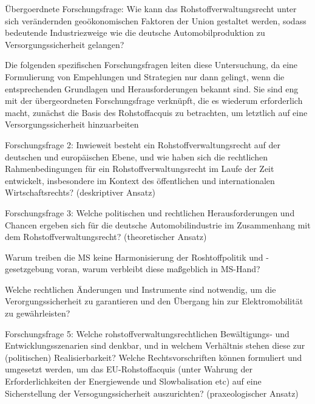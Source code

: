 \documentclass[12pt,a4paper,oneside]{book} %
\begin{document}
Übergoerdnete Forschungsfrage: Wie kann das Rohstoffverwaltungsrecht unter sich verändernden geoökonomischen Faktoren der Union gestaltet werden, sodass bedeutende Industriezweige wie die deutsche Automobilproduktion zu Versorgungssicherheit gelangen?

Die folgenden spezifischen Forschungsfragen leiten diese Untersuchung, da eine Formulierung von Empehlungen und Strategien nur dann gelingt, wenn die entsprechenden Grundlagen und Herausforderungen bekannt sind. Sie sind eng mit der übergeordneten Forschungsfrage verknüpft, die es wiederum erforderlich macht, zunächst die Basis des Rohstoffacquis zu betrachten, um letztlich auf eine Versorgungssicherheit hinzuarbeiten



Forschungsfrage 2: Inwieweit besteht ein Rohstoffverwaltungsrecht auf der deutschen und europäischen Ebene, und wie haben sich die rechtlichen Rahmenbedingungen für ein Rohstoffverwaltungsrecht im Laufe der Zeit entwickelt, insbesondere im Kontext des öffentlichen und internationalen Wirtschaftsrechts? (deskriptiver Ansatz)

Forschungsfrage 3: Welche politischen und rechtlichen Herausforderungen und Chancen ergeben sich für die deutsche Automobilindustrie im Zusammenhang mit dem Rohstoffverwaltungsrecht? (theoretischer Ansatz)


Warum treiben die MS keine Harmonisierung der Roshtoffpolitik und -gesetzgebung voran, warum verbleibt diese maßgeblich in MS-Hand?

Welche rechtlichen Änderungen und Instrumente sind notwendig, um die Verorgungssicherheit zu garantieren und den Übergang hin zur Elektromobilität zu gewährleisten?

Forschungsfrage 5: Welche rohstoffverwaltungsrechtlichen Bewältigungs- und Entwicklungsszenarien sind denkbar, und in welchem Verhältnis stehen diese zur (politischen) Realisierbarkeit? Welche Rechtsvorschriften können formuliert und umgesetzt werden, um das EU-Rohstoffacquis (unter Wahrung der Erforderlichkeiten der Energiewende und Slowbalisation etc) auf eine Sicherstellung der Versogungssicherheit auszurichten? (praxeologischer Ansatz)
\end{document}
